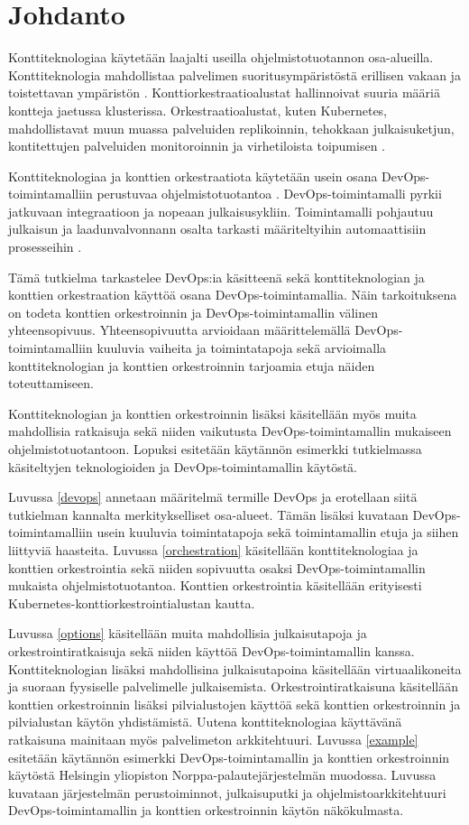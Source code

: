 \chapter{Johdanto\label{intro}}

Konttiteknologiaa käytetään laajalti useilla ohjelmistotuotannon osa-alueilla.
Konttiteknologia mahdollistaa palvelimen suoritusympäristöstä erillisen vakaan ja toistettavan ympäristön \cite{Watada19}.
Konttiorkestraatioalustat hallinnoivat suuria määriä kontteja jaetussa klusterissa.
Orkestraatioalustat, kuten Kubernetes, mahdollistavat muun muassa palveluiden replikoinnin, tehokkaan julkaisuketjun, kontitettujen palveluiden monitoroinnin ja virhetiloista toipumisen \cite{Khan17}.

Konttiteknologiaa ja konttien orkestraatiota käytetään usein osana DevOps-toimintamalliin perustuvaa ohjelmistotuotantoa \cite{Kang16, Narasimhulu23}.
DevOps-toimintamalli pyrkii jatkuvaan integraatioon ja nopeaan julkaisusykliin.
Toimintamalli pohjautuu julkaisun ja laadunvalvonnann osalta tarkasti määriteltyihin automaattisiin prosesseihin \cite{Jabbari16}.

Tämä tutkielma tarkastelee DevOps:ia käsitteenä sekä konttiteknologian ja konttien orkestraation käyttöä osana DevOps-toimintamallia.
Näin tarkoituksena on todeta konttien orkestroinnin ja DevOps-toimintamallin välinen yhteensopivuus.
Yhteensopivuutta arvioidaan määrittelemällä DevOps-toimintamalliin kuuluvia vaiheita ja toimintatapoja sekä arvioimalla konttiteknologian ja konttien orkestroinnin tarjoamia etuja näiden toteuttamiseen.

Konttiteknologian ja konttien orkestroinnin lisäksi käsitellään myös muita mahdollisia ratkaisuja sekä niiden vaikutusta DevOps-toimintamallin mukaiseen ohjelmistotuotantoon.
Lopuksi esitetään käytännön esimerkki tutkielmassa käsiteltyjen teknologioiden ja DevOps-toimintamallin käytöstä.

Luvussa \ref{devops} annetaan määritelmä termille DevOps ja erotellaan siitä tutkielman kannalta merkitykselliset osa-alueet.
Tämän lisäksi kuvataan DevOps-toimintamalliin usein kuuluvia toimintatapoja sekä toimintamallin etuja ja siihen liittyviä haasteita.
Luvussa \ref{orchestration} käsitellään konttiteknologiaa ja konttien orkestrointia sekä niiden sopivuutta osaksi DevOps-toimintamallin mukaista ohjelmistotuotantoa.
Konttien orkestrointia käsitellään erityisesti Kubernetes-konttiorkestrointialustan kautta.

Luvussa \ref{options} käsitellään muita mahdollisia julkaisutapoja ja orkestrointiratkaisuja sekä niiden käyttöä DevOps-toimintamallin kanssa.
Konttiteknologian lisäksi mahdollisina julkaisutapoina käsitellään virtuaalikoneita ja suoraan fyysiselle palvelimelle julkaisemista.
Orkestrointiratkaisuna käsitellään konttien orkestroinnin lisäksi pilvialustojen käyttöä sekä konttien orkestroinnin ja pilvialustan käytön yhdistämistä.
Uutena konttiteknologiaa käyttävänä ratkaisuna mainitaan myös palvelimeton arkkitehtuuri.
Luvussa \ref{example} esitetään käytännön esimerkki DevOps-toimintamallin ja konttien orkestroinnin käytöstä Helsingin yliopiston Norppa-palautejärjestelmän muodossa.
Luvussa kuvataan järjestelmän perustoiminnot, julkaisuputki ja ohjelmistoarkkitehtuuri DevOps-toimintamallin ja konttien orkestroinnin käytön näkökulmasta.
